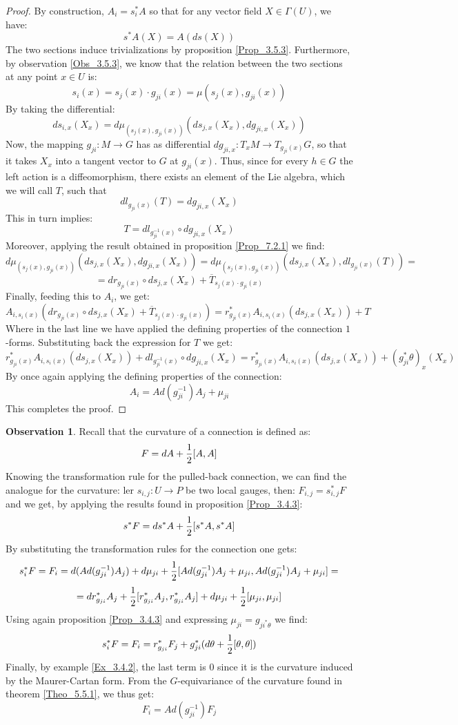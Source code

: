 \documentclass[12pt,a4paper]{report}
\theoremstyle{definition}
\theoremstyle{Theorem}
\theoremstyle{definition}
\theoremstyle{definition}
\newtheorem{Obs}[Def]{Observation}
\begin{document}
	\begin{proof}
		By construction, $A_i=s_i^*A$ so that for any vector field $X\in \Gamma(U)$, we have:
		$$s^*A(X)=A(ds(X))$$
		The two sections induce trivializations by proposition \ref{Prop_3.5.3}. Furthermore, by observation \ref{Obs_3.5.3}, we know that the relation between the two sections at any point $x\in U$ is:
		$$s_i(x)=s_j(x)\cdot g_{ji}(x)=\mu(s_j(x),g_{ji}(x))$$
		By taking the differential:
		$$ds_{i,x}(X_x)=d\mu_{(s_{j}(x), g_{ji}(x))}(ds_{j,x}(X_x),dg_{ji,x}(X_x))$$
		Now, the mapping $g_{ji}:M\rightarrow G$ has as differential $dg_{ji,x}:T_xM\rightarrow T_{g_{ji}(x)}G$, so that it takes $X_x$ into a tangent vector to $G$ at $g_{ji}(x)$. Thus, since for every $h\in G$ the left action is a diffeomorphism, there exists an element of the Lie algebra, which we will call $T$, such that 
		$$dl_{g_{ji}(x)}(T)=dg_{ji,x}(X_x)$$
		This in turn implies:
		$$T=dl_{g^{-1}_{ji}(x)}\circ dg_{ji,x}(X_x)$$
		Moreover, applying the result obtained in proposition \ref{Prop_7.2.1} we find:
		$$d\mu_{(s_{j}(x), g_{ji}(x))}(ds_{j,x}(X_x),dg_{ji,x}(X_x))=d\mu_{(s_{j}(x), g_{ji}(x))}(ds_{j,x}(X_x),dl_{g_{ji}(x)}(T))=$$
		$$=dr_{g_{ji}(x)}\circ ds_{j,x}(X_x)+\overline{T}_{s_{j}(x)\cdot g_{ji}(x)}$$
		Finally, feeding this to $A_i$, we get:
		$$A_{i,s_i(x)}(dr_{g_{ji}(x)}\circ ds_{j,x}(X_x)+\overline{T}_{s_{j}(x)\cdot g_{ji}(x)})=r^*_{g_{ji}(x)}A_{i,{s_i(x)}}(ds_{j,x}(X_x))+T$$
		Where in the last line we have applied the defining properties of the connection $1$-forms. Substituting back the expression for $T$ we get:
		$$r^*_{g_{ji}(x)}A_{i,{s_i(x)}}(ds_{j,x}(X_x))+dl_{g^{-1}_{ji}(x)}\circ dg_{ji,x}(X_x)=r^*_{g_{ji}(x)}A_{i,{s_i(x)}}(ds_{j,x}(X_x))+(g^*_{ji}\theta)_x(X_x)$$
		By once again applying the defining properties of the connection:
		$$A_i=Ad(g_{ji}^{-1})A_j+\mu_{ji}$$
		This completes the proof.
	\end{proof}
	\begin{Obs}\label{Obs_7.2.2}
		Recall that the curvature of a connection is defined as:
		$$F=dA+{1\over 2}[A,A]$$
		Knowing the transformation rule for the pulled-back connection, we can find the analogue for the curvature: ler $s_{i,j}:U\rightarrow P$ be two local gauges, then: $F_{i,j}=s_{i,j}^*F$ and we get, by applying the results found in proposition \ref{Prop_3.4.3}:
		$$s^*F=ds^*A+{1\over 2}[s^*A,s^*A]$$
		By substituting the transformation rules for the connection one gets:
		$$s_i^*F=F_i=d(Ad(g_{ji}^{-1})A_j)+d\mu_{ji}+{1\over 2}[Ad(g_{ji}^{-1})A_j+\mu_{ji},Ad(g_{ji}^{-1})A_j+\mu_{ji}]=$$
		$$=dr^*_{g_{ji}}A_j+{1\over 2}[r^*_{g_{ji}}A_j,r^*_{g_{ji}}A_j]+d\mu_{ji}+{1\over 2}[\mu_{ji},\mu_{ji}]$$
		Using again proposition \ref{Prop_3.4.3} and expressing $\mu_{ji}=g_{ji^*\theta}$ we find:
		$$s_i^*F=F_i=r^*_{g_{ji}}F_j+g_{ji}^*(d\theta+{1\over 2}[\theta,\theta])$$
		Finally, by example \ref{Ex_3.4.2}, the last term is 0 since it is the curvature induced by the Maurer-Cartan form. From the $G$-equivariance of the curvature found in theorem \ref{Theo_5.5.1}, we thus get:
		$$F_i=Ad(g_{ji}^{-1})F_j$$
	\end{Obs}
\end{document}

